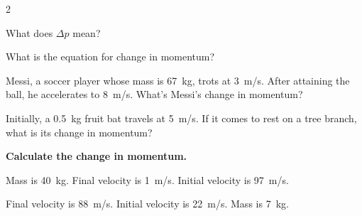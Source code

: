 \documentclass{article}
\numberwithin{equation}{section}
\numberwithin{figure}{section}
\begin{document}
\begin{multicols}{2}








\begin{exercise}
    What does $\Delta p$ mean?
\end{exercise}

\begin{exercise}
    What is the equation for change in momentum? 
\end{exercise}

\begin{exercise} \label{Isttuf}
    Messi, a soccer player whose mass is \SI{67}{kg}, trots at \SI{3}{m/s}. After attaining the ball, he accelerates to \SI{8}{m/s}. What's Messi's change in momentum? 
\end{exercise}

\begin{exercise} \label{1vMk6B}
    Initially, a \SI{0.5}{kg} fruit bat travels at \SI{5}{m/s}. If it comes to rest on a tree branch, what is its change in momentum?
\end{exercise}

\cyanhrule

\textbf{Calculate the change in momentum.}

\begin{exercise} \label{VtoBkS}
    Mass is \SI{40}{kg}. Final velocity is \SI{1}{m/s}. Initial velocity is \SI{97}{m/s}.
\end{exercise}

\begin{exercise} \label{fhENr6}
    Final velocity is \SI{88}{m/s}. Initial velocity is \SI{22}{m/s}. Mass is \SI{7}{kg}.
\end{exercise}


\end{multicols}
\end{document}
